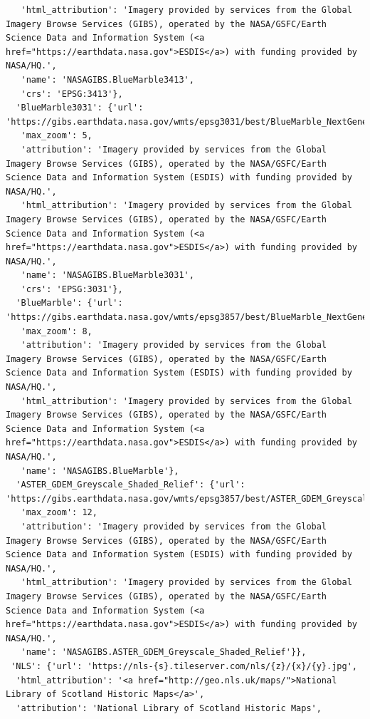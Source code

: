 \documentclass[
  letterpaper,
  DIV=11,
  numbers=noendperiod]{scrreprt}
\begin{document}
\begin{verbatim}
   'html_attribution': 'Imagery provided by services from the Global Imagery Browse Services (GIBS), operated by the NASA/GSFC/Earth Science Data and Information System (<a href="https://earthdata.nasa.gov">ESDIS</a>) with funding provided by NASA/HQ.',
   'name': 'NASAGIBS.BlueMarble3413',
   'crs': 'EPSG:3413'},
  'BlueMarble3031': {'url': 'https://gibs.earthdata.nasa.gov/wmts/epsg3031/best/BlueMarble_NextGeneration/default/EPSG3031_500m/{z}/{y}/{x}.jpeg',
   'max_zoom': 5,
   'attribution': 'Imagery provided by services from the Global Imagery Browse Services (GIBS), operated by the NASA/GSFC/Earth Science Data and Information System (ESDIS) with funding provided by NASA/HQ.',
   'html_attribution': 'Imagery provided by services from the Global Imagery Browse Services (GIBS), operated by the NASA/GSFC/Earth Science Data and Information System (<a href="https://earthdata.nasa.gov">ESDIS</a>) with funding provided by NASA/HQ.',
   'name': 'NASAGIBS.BlueMarble3031',
   'crs': 'EPSG:3031'},
  'BlueMarble': {'url': 'https://gibs.earthdata.nasa.gov/wmts/epsg3857/best/BlueMarble_NextGeneration/default/EPSG3857_500m/{z}/{y}/{x}.jpeg',
   'max_zoom': 8,
   'attribution': 'Imagery provided by services from the Global Imagery Browse Services (GIBS), operated by the NASA/GSFC/Earth Science Data and Information System (ESDIS) with funding provided by NASA/HQ.',
   'html_attribution': 'Imagery provided by services from the Global Imagery Browse Services (GIBS), operated by the NASA/GSFC/Earth Science Data and Information System (<a href="https://earthdata.nasa.gov">ESDIS</a>) with funding provided by NASA/HQ.',
   'name': 'NASAGIBS.BlueMarble'},
  'ASTER_GDEM_Greyscale_Shaded_Relief': {'url': 'https://gibs.earthdata.nasa.gov/wmts/epsg3857/best/ASTER_GDEM_Greyscale_Shaded_Relief/default/GoogleMapsCompatible_Level12/{z}/{y}/{x}.jpg',
   'max_zoom': 12,
   'attribution': 'Imagery provided by services from the Global Imagery Browse Services (GIBS), operated by the NASA/GSFC/Earth Science Data and Information System (ESDIS) with funding provided by NASA/HQ.',
   'html_attribution': 'Imagery provided by services from the Global Imagery Browse Services (GIBS), operated by the NASA/GSFC/Earth Science Data and Information System (<a href="https://earthdata.nasa.gov">ESDIS</a>) with funding provided by NASA/HQ.',
   'name': 'NASAGIBS.ASTER_GDEM_Greyscale_Shaded_Relief'}},
 'NLS': {'url': 'https://nls-{s}.tileserver.com/nls/{z}/{x}/{y}.jpg',
  'html_attribution': '<a href="http://geo.nls.uk/maps/">National Library of Scotland Historic Maps</a>',
  'attribution': 'National Library of Scotland Historic Maps',

\end{verbatim}
\end{document}
